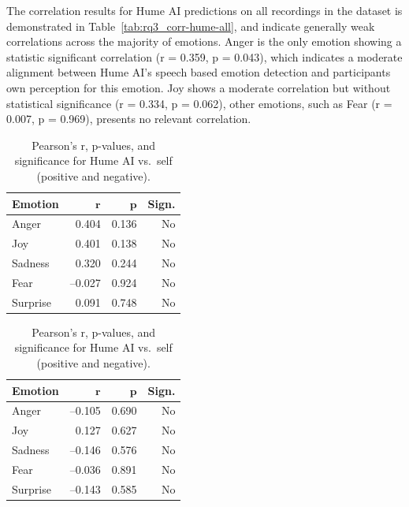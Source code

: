 The correlation results for Hume AI predictions on all recordings in the dataset is demonstrated in Table~\ref{tab:rq3_corr-hume-all}, and indicate generally weak correlations across the majority of emotions. 
Anger is the only emotion showing a statistic significant correlation (r = 0.359, p = 0.043), which indicates a moderate alignment between Hume AI's speech based emotion 
detection and participants own perception for this emotion. Joy shows a moderate correlation but without statistical significance (r = 0.334, p = 0.062), other emotions, such as Fear (r = 0.007, p = 0.969), presents no relevant correlation. 

\begin{table}[H]
    \centering
  
    \begin{subtable}{0.45\textwidth}
      \centering
      \caption{\textbf{Positive Recordings (Hume)}}
      \label{tab:rq3_corr-hume-pos}
      \begin{tabular}{l r r r}
        \toprule
        \textbf{Emotion} & \(\mathbf{r}\) & \(\mathbf{p}\) & \textbf{Sign.} \\
        \midrule
        Anger    &  0.404 & 0.136 & No  \\
        Joy      &  0.401 & 0.138 & No  \\
        Sadness  &  0.320 & 0.244 & No  \\
        Fear     & –0.027 & 0.924 & No  \\
        Surprise &  0.091 & 0.748 & No  \\
        \bottomrule
      \end{tabular}
    \end{subtable}\hfill
    \begin{subtable}{0.45\textwidth}
      \centering
      \caption{\textbf{Negative Recordings (Hume)}}\label{tab:rq3_corr-hume-neg}
      \begin{tabular}{l r r r}
        \toprule
        \textbf{Emotion} & \(\mathbf{r}\) & \(\mathbf{p}\) & \textbf{Sign.} \\
        \midrule
        Anger    & –0.105 & 0.690 & No  \\
        Joy      &  0.127 & 0.627 & No  \\
        Sadness  & –0.146 & 0.576 & No  \\
        Fear     & –0.036 & 0.891 & No  \\
        Surprise & –0.143 & 0.585 & No  \\
        \bottomrule
      \end{tabular}
    \end{subtable}
  
    \caption{Pearson’s r, p-values, and significance for Hume AI vs.\ self (positive and negative).}
    \label{tab:rq3_corr-hume-pos-neg}
  \end{table}

